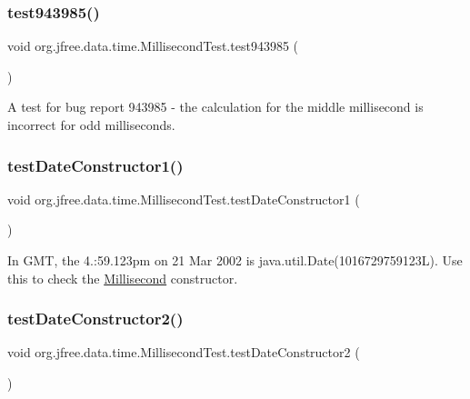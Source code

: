 \subsubsection{\texorpdfstring{test943985()}{test943985()}}
{\footnotesize\ttfamily void org.\+jfree.\+data.\+time.\+Millisecond\+Test.\+test943985 (\begin{DoxyParamCaption}{ }\end{DoxyParamCaption})}

A test for bug report 943985 -\/ the calculation for the middle millisecond is incorrect for odd milliseconds. \mbox{\label{classorg_1_1jfree_1_1data_1_1time_1_1_millisecond_test_a9d6bd2d8d1970973ecf0a51f7749584a}} 
\subsubsection{\texorpdfstring{test\+Date\+Constructor1()}{testDateConstructor1()}}
{\footnotesize\ttfamily void org.\+jfree.\+data.\+time.\+Millisecond\+Test.\+test\+Date\+Constructor1 (\begin{DoxyParamCaption}{ }\end{DoxyParamCaption})}

In G\+MT, the 4.\+:59.\+123pm on 21 Mar 2002 is java.\+util.\+Date(1016729759123\+L). Use this to check the \mbox{\hyperlink{classorg_1_1jfree_1_1data_1_1time_1_1_millisecond}{Millisecond}} constructor. \mbox{\label{classorg_1_1jfree_1_1data_1_1time_1_1_millisecond_test_af014f7972606608f61926467a07a73cb}} 
\subsubsection{\texorpdfstring{test\+Date\+Constructor2()}{testDateConstructor2()}}
{\footnotesize\ttfamily void org.\+jfree.\+data.\+time.\+Millisecond\+Test.\+test\+Date\+Constructor2 (\begin{DoxyParamCaption}{ }\end{DoxyParamCaption})}

